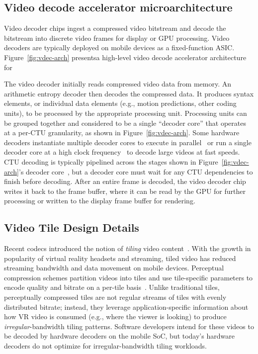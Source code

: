 \subsection{Video decode accelerator microarchitecture}
\label{subsec:vd-arch}
Video decoder chips ingest a compressed video bitstream and decode the bitstream into discrete video frames for display or GPU processing.
Video decoders are typically deployed on mobile devices as a fixed-function ASIC.
Figure~\ref{fig:vdec-arch} presentsa high-level video decode accelerator architecture for \hevc

The video decoder initially reads compressed video data from memory.
An arithmetic entropy decoder then decodes the compressed data.
It produces syntax elements, or individual data elements (e.g., motion predictions, other coding units), to be processed by the appropriate processing unit.
Processing units can be grouped together and considered to be a single ``decoder core'' that operates at a per-CTU granularity, as shown in Figure~\ref{fig:vdec-arch}.
Some hardware decoders instantiate multiple decoder cores to execute in parallel~\cite{tikekar18ijssc} or run a single decoder core at a high clock frequency~\cite{8khevc-ijssc} to decode large videos at fast speeds.
CTU decoding is typically pipelined across the stages shown in Figure~\ref{fig:vdec-arch}'s decoder core~\cite{8khevc-ijssc}, but a decoder core must wait for any CTU dependencies to finish before decoding.
After an entire frame is decoded, the video decoder chip writes it back to the frame buffer, where it can be read by the GPU for further processing or written to the display frame buffer for rendering.

\subsection{Video Tile Design Details}
\label{subsec:tiles}

Recent codecs introduced the notion of \emph{tiling} video content~\cite{misra2013tiles}.
With the growth in popularity of virtual reality headsets and \threesixty streaming, tiled video has reduced streaming bandwidth and data movement on mobile devices.
Perceptual compression schemes partition videos into tiles and use tile-specific parameters to encode quality and bitrate on a per-tile basis~\cite{visualcloud2017haynes}.
Unlike traditional \hevc tiles, perceptually compressed tiles are not regular streams of tiles with evenly distributed bitrate; instead, they leverage application-specific information about how VR video is consumed (e.g., where the viewer is looking) to produce \emph{irregular}-bandwidth tiling patterns.
Software developers intend for these videos to be decoded by hardware decoders on the mobile SoC, but today's hardware decoders do not optimize for irregular-bandwidth tiling workloads.

